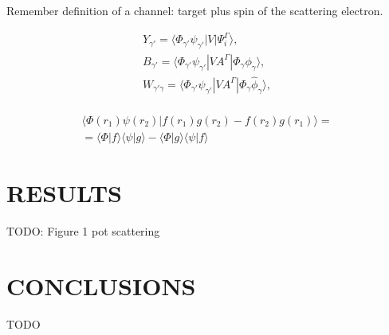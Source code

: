 \documentclass[aip
, pra
, showpacs
, aps
, twocolumn
, groupedaddress
, floatfix
]{revtex4}
\newcommand{\beq}{\begin{equation}}
\newcommand{\eeq}{\end{equation}}
\newcommand{\barr}{\begin{array}}
\newcommand{\earr}{\end{array}}
\begin{document}
Remember definition of a channel: target plus spin of the scattering electron.


\beq \barr{l}
Y_{\gamma'} = \langle \Phi_{\gamma'}  \psi_{\gamma'} |V|\Psi_i^{\Gamma} \rangle,\\
B_{\gamma'} = \langle  \Phi_{\gamma'}  \psi_{\gamma'} |VA^{\Gamma} |\Phi_{\gamma} \phi_{\gamma} \rangle,\\
W_{\gamma' \gamma} = \langle \Phi_{\gamma'}  \psi_{\gamma'} |V A^{\Gamma} |\Phi_{\gamma} \widehat{\phi}_{\gamma} \rangle,\\
\earr \label{Psi_} \eeq

\beq \barr{l}
\langle  \Phi(r_1) \psi(r_2) |f(r_1) g(r_2) - f(r_2) g(r_1) \rangle = \\
=\langle  \Phi |f \rangle  \langle  \psi |g \rangle -
\langle  \Phi |g \rangle  \langle  \psi |f \rangle
\earr \eeq


\section{RESULTS}
TODO: Figure 1 pot scattering

\section{CONCLUSIONS}
TODO


\begin{acknowledgments}
\end{acknowledgments}





%
\end{document}

